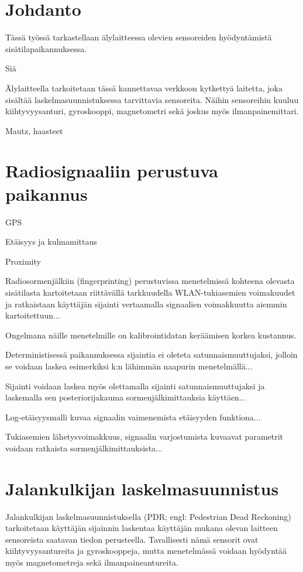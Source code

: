 \section{Johdanto}

Tässä työssä tarkastellaan älylaitteessa olevien sensoreiden hyödyntämistä
sisätilapaikannuksessa. 

Siä

Älylaitteella tarkoitetaan tässä kannettavaa verkkoon kytkettyä laitetta, joka
sisältää laskelmasuunnistuksessa tarvittavia sensoreita. Näihin sensoreihin
kuuluu kiihtyvyysanturi, gyroskooppi, magnetometri sekä joskus myös
ilmanpainemittari.

Mautz, haasteet \cite{mautz2012indoor}


\section{Radiosignaaliin perustuva paikannus}

GPS

Etäisyys ja kulmamittaus

Proximity

Radiosormenjälkiin (fingerprinting) perustuvissa menetelmissä kohteena olevasta
sisätilasta kartoitetaan riittävällä tarkkuudella WLAN-tukiasemien voimakuudet
ja ratkaistaan käyttäjän sijainti vertaamalla signaalien voimakkuutta
aiemmin kartoitettuun...

Ongelmana näille menetelmille on kalibrointidatan keräämisen korkea kustannus.

Deterministisessä paikannuksessa sijaintia ei oleteta satunnaismuuttujaksi,
jolloin se voidaan laskea esimerkiksi k:n lähimmän naapurin menetelmällä...

Sijainti voidaan laskea myös olettamalla sijainti satunnaismuuttujaksi
ja laskemalla sen posteriorijakauma sormenjälkimittauksia käyttäen...

Log-etäisyysmalli kuvaa signaalin vaimenemista etäisyyden funktiona...

Tukiasemien lähetysvoimakkuus, signaalin varjostumista kuvaavat parametrit
voidaan ratkaista sormenjälkimittauksista...

\section{Jalankulkijan laskelmasuunnistus}

Jalankulkijan laskelmasuunnistuksella (PDR; engl: Pedestrian Dead Reckoning)
tarkoitetaan käyttäjän sijainnin laskentaa käyttäjän mukana olevan laitteen
sensoreista saatavan tiedon perusteella. Tavallisesti nämä sensorit ovat
kiihtyvyysantureita ja gyroskooppeja, mutta menetelmässä voidaan hyödyntää myös
magnetometreja sekä ilmanpaineantureita.

